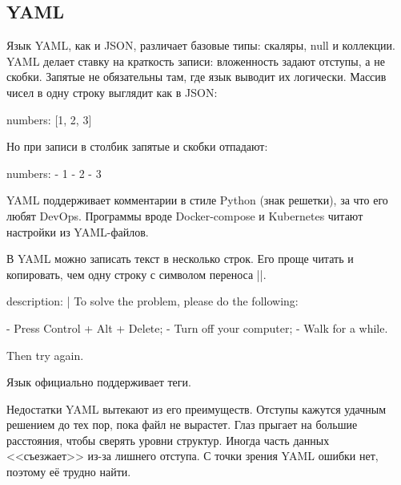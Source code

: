 \subsection{YAML}


Язык YAML, как и JSON, различает базовые типы: скаляры, null и коллекции. YAML
делает ставку на краткость записи: вложенность задают отступы, а не
скобки. Запятые не обязательны там, где язык выводит их логически. Массив чисел
в одну строку выглядит как в JSON:


\begin{english}
  \begin{yaml}
numbers: [1, 2, 3]
  \end{yaml}
\end{english}

\noindent
Но при записи в столбик запятые и скобки отпадают:

\begin{english}
  \begin{yaml}
numbers:
  - 1
  - 2
  - 3
  \end{yaml}
\end{english}

YAML поддерживает комментарии в стиле Python (знак решетки), за что его любят
DevOps. Программы вроде Docker-compose и Kubernetes читают настройки из
YAML-файлов.

В YAML можно записать текст в несколько строк. Его проще читать и копировать,
чем одну строку с символом переноса \spverb|\n|.

\begin{english}
  \begin{yaml}
description: |
  To solve the problem, please do the following:

  - Press Control + Alt + Delete;
  - Turn off your computer;
  - Walk for a while.

  Then try again.
  \end{yaml}
\end{english}

Язык официально поддерживает теги.


Недостатки YAML вытекают из его преимуществ. Отступы кажутся удачным решением до
тех пор, пока файл не вырастет. Глаз прыгает на большие расстояния, чтобы
сверять уровни структур. Иногда часть данных <<съезжает>> из-за лишнего
отступа. С точки зрения YAML ошибки нет, поэтому е\"{е} трудно найти.

